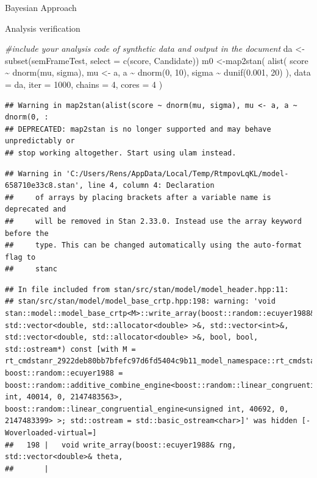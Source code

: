 \documentclass[
  ignorenonframetext,
]{beamer}
\newenvironment{Shaded}{\begin{snugshade}}{\end{snugshade}}
\newcommand{\AttributeTok}[1]{\textcolor[rgb]{0.77,0.63,0.00}{#1}}
\newcommand{\CommentTok}[1]{\textcolor[rgb]{0.56,0.35,0.01}{\textit{#1}}}
\newcommand{\DecValTok}[1]{\textcolor[rgb]{0.00,0.00,0.81}{#1}}
\newcommand{\FloatTok}[1]{\textcolor[rgb]{0.00,0.00,0.81}{#1}}
\newcommand{\FunctionTok}[1]{\textcolor[rgb]{0.00,0.00,0.00}{#1}}
\newcommand{\NormalTok}[1]{#1}
\newcommand{\OtherTok}[1]{\textcolor[rgb]{0.56,0.35,0.01}{#1}}
\newcommand{\SpecialCharTok}[1]{\textcolor[rgb]{0.00,0.00,0.00}{#1}}
\begin{document}
\begin{frame}[fragile]{Bayesian Approach}
\begin{block}{Analysis verification}
\begin{Shaded}
\begin{Highlighting}[]
\CommentTok{\#include your analysis code of synthetic data and output in the document}
\NormalTok{da }\OtherTok{\textless{}{-}} \FunctionTok{subset}\NormalTok{(semFrameTest, }\AttributeTok{select =} \FunctionTok{c}\NormalTok{(score, Candidate))}
\NormalTok{m0 }\OtherTok{\textless{}{-}}\FunctionTok{map2stan}\NormalTok{(}
  \FunctionTok{alist}\NormalTok{(}
\NormalTok{    score }\SpecialCharTok{\textasciitilde{}} \FunctionTok{dnorm}\NormalTok{(mu, sigma),}
\NormalTok{    mu }\OtherTok{\textless{}{-}}\NormalTok{ a,}
\NormalTok{    a }\SpecialCharTok{\textasciitilde{}} \FunctionTok{dnorm}\NormalTok{(}\DecValTok{0}\NormalTok{, }\DecValTok{10}\NormalTok{),}
\NormalTok{    sigma }\SpecialCharTok{\textasciitilde{}} \FunctionTok{dunif}\NormalTok{(}\FloatTok{0.001}\NormalTok{, }\DecValTok{20}\NormalTok{)}
\NormalTok{  ), }\AttributeTok{data =}\NormalTok{ da, }\AttributeTok{iter =} \DecValTok{1000}\NormalTok{, }\AttributeTok{chains =} \DecValTok{4}\NormalTok{, }\AttributeTok{cores =} \DecValTok{4}
\NormalTok{)}
\end{Highlighting}
\end{Shaded}

\begin{verbatim}
## Warning in map2stan(alist(score ~ dnorm(mu, sigma), mu <- a, a ~ dnorm(0, :
## DEPRECATED: map2stan is no longer supported and may behave unpredictably or
## stop working altogether. Start using ulam instead.
\end{verbatim}

\begin{verbatim}
## Warning in 'C:/Users/Rens/AppData/Local/Temp/RtmpovLqKL/model-658710e33c8.stan', line 4, column 4: Declaration
##     of arrays by placing brackets after a variable name is deprecated and
##     will be removed in Stan 2.33.0. Instead use the array keyword before the
##     type. This can be changed automatically using the auto-format flag to
##     stanc
\end{verbatim}

\begin{verbatim}
## In file included from stan/src/stan/model/model_header.hpp:11:
## stan/src/stan/model/model_base_crtp.hpp:198: warning: 'void stan::model::model_base_crtp<M>::write_array(boost::random::ecuyer1988&, std::vector<double, std::allocator<double> >&, std::vector<int>&, std::vector<double, std::allocator<double> >&, bool, bool, std::ostream*) const [with M = rt_cmdstanr_2922deb80bb7bfefc97d6fd5404c9b11_model_namespace::rt_cmdstanr_2922deb80bb7bfefc97d6fd5404c9b11_model; boost::random::ecuyer1988 = boost::random::additive_combine_engine<boost::random::linear_congruential_engine<unsigned int, 40014, 0, 2147483563>, boost::random::linear_congruential_engine<unsigned int, 40692, 0, 2147483399> >; std::ostream = std::basic_ostream<char>]' was hidden [-Woverloaded-virtual=]
##   198 |   void write_array(boost::ecuyer1988& rng, std::vector<double>& theta,
##       |
\end{verbatim}


\end{block}
\end{frame}
\end{document}
